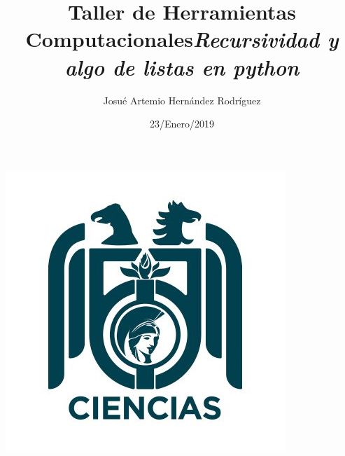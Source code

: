 \documentclass[letterpaper, 12pt,oneside]{article}
\title{\Huge Taller de Herramientas Computacionales}
\author{Josué Artemio Hernández Rodríguez}
\date{23/Enero/2019}
\begin{document}
	\maketitle
	\begin{center}
		\includegraphics[scale=0.7]{3.jpg}
	\end{center}

	\newpage
	
	\title{\huge \textit{Recursividad y algo de listas en python }}\\
	
\end{document}
